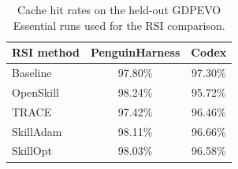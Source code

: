 \begin{table}[!htbp]
  \centering
  \small
  \caption{Cache hit rates on the held-out GDPEVO Essential runs used for the RSI comparison.}
  \label{tab:rsi-holdout-cache}
  \begin{tabular}{@{}lcc@{}}
    \toprule
    \textbf{RSI method} & \textbf{PenguinHarness} & \textbf{Codex} \\
    \midrule
    Baseline & 97.80\% & 97.30\% \\
    OpenSkill & 98.24\% & 95.72\% \\
    TRACE & 97.42\% & 96.46\% \\
    SkillAdam & 98.11\% & 96.66\% \\
    SkillOpt & 98.03\% & 96.58\% \\
    \bottomrule
  \end{tabular}
\end{table}
